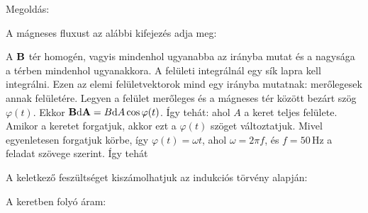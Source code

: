 
\ifdefined\megoldas

 Megoldás: 

 A mágneses fluxust az alábbi kifejezés adja meg:

 A $\mathbf{B}$ tér homogén, vagyis mindenhol ugyanabba az irányba mutat és a nagysága a térben mindenhol ugyanakkora. A felületi integrálnál egy sík lapra kell integrálni. Ezen az elemi felületvektorok mind egy irányba mutatnak: merőlegesek annak felületére. Legyen a felület merőleges és a mágneses tér között bezárt szög $\varphi(t)$. Ekkor $\mathbf{B}\mathrm{d}\mathbf{A}=B\mathrm{d} A\cos\varphi(t)$. Így tehát:
 ahol $A$ a keret teljes felülete. Amikor a keretet forgatjuk, akkor ezt a $\varphi(t)$ szöget változtatjuk. Mivel egyenletesen forgatjuk körbe, így $\varphi(t)=\omega t$, ahol $\omega=2\pi f$, és $f=50\,$Hz a feladat szövege szerint. Így tehát 

 A keletkező feszültséget kiszámolhatjuk az indukciós törvény alapján:

 A keretben folyó áram:
 
\fi